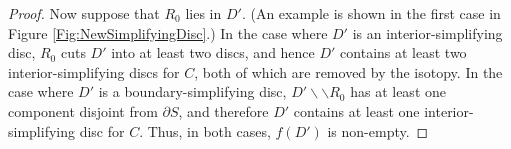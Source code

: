 \documentclass[oneside]{amsart}
\renewcommand\marginpar[1]{{\tiny \marginnote{{#1}}}
  \normalmarginpar}
\numberwithin{equation}{section}
\theoremstyle{plain}
\newtheorem{lemma}[equation]{Lemma}
\theoremstyle{definition}
\newcommand{\cut}{\backslash\backslash}
\newcommand{\calH}{\mathcal{H}}
\newcommand{\calB}{\mathcal{B}}
\begin{document}
\begin{proof}
Now suppose that $R_0$ lies in $D'$. (An example is shown in the first case in Figure \ref{Fig:NewSimplifyingDisc}.) In the case where $D'$ is an interior-simplifying disc, $R_0$ cuts $D'$ into at least two discs, and hence $D'$ contains at least two interior-simplifying discs for $C$, both of which are removed by the isotopy. In the case where $D'$ is a boundary-simplifying disc, $D' \cut R_0$ has at least one component disjoint from $\partial S$, and therefore $D'$ contains at least one interior-simplifying disc for $C$. Thus, in both cases, $f(D')$ is non-empty.
\end{proof}





\end{document}
